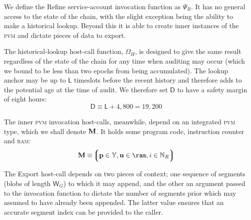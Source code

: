 We define the Refine service-account invocation function as $\Psi_R$. It has no general access to the state of the \Jam chain, with the slight exception being the ability to make a historical lookup. Beyond this it is able to create inner instances of the \textsc{pvm} and dictate pieces of data to export.

The historical-lookup host-call function, $\Omega_H$, is designed to give the same result regardless of the state of the chain for any time when auditing may occur (which we bound to be less than two epochs from being accumulated). The lookup anchor may be up to $\mathsf{L}$ timeslots before the recent history and therefore adds to the potential age at the time of audit. We therefore set $\mathsf{D}$ to have a safety margin of eight hours:
\begin{equation}
  \mathsf{D} \equiv \mathsf{L} + 4,800 = 19,200
\end{equation}

The inner \textsc{pvm} invocation host-calls, meanwhile, depend on an integrated \textsc{pvm} type, which we shall denote $\mathbf{M}$. It holds some program code, instruction counter and \textsc{ram}:
\begin{equation}
  \pvm \equiv \tuple{\isa{\mathbf{p}}{\blob}, \isa{\mathbf{u}}{\ram}, \isa{i}{\pvmreg}}
\end{equation}

The Export host-call depends on two pieces of context; one sequence of segments (blobs of length $\mathsf{W}_G$) to which it may append, and the other an argument passed to the invocation function to dictate the number of segments prior which may assumed to have already been appended. The latter value ensures that an accurate segment index can be provided to the caller.


